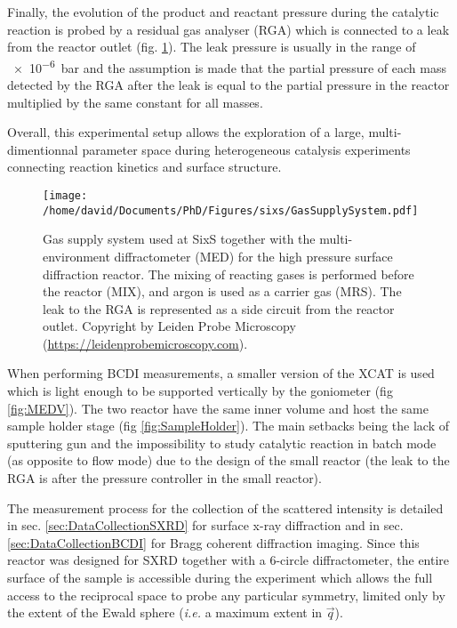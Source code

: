 Finally, the evolution of the product and reactant pressure during the catalytic reaction is probed by a residual gas analyser (RGA) which is connected to a leak from the reactor outlet (fig. \ref{fig:GasSupplySystem}).
The leak pressure is usually in the range of \qty{e-6}{\bar} and the assumption is made that the partial pressure of each mass detected by the RGA after the leak is equal to the partial pressure in the reactor multiplied by the same constant for all masses.

Overall, this experimental setup allows the exploration of a large, multi-dimentionnal parameter space during heterogeneous catalysis experiments connecting reaction kinetics and surface structure.

\begin{figure}[!htb]
    \centering
    \texttt{[image: /home/david/Documents/PhD/Figures/sixs/GasSupplySystem.pdf]}
    \caption{
    	Gas supply system used at SixS together with the multi-environment diffractometer (MED) for the high pressure surface diffraction reactor.
    	The mixing of reacting gases is performed before the reactor (MIX), and argon is used as a carrier gas (MRS).
    	The leak to the RGA is represented as a side circuit from the reactor outlet.
    	Copyright by Leiden Probe Microscopy (\url{https://leidenprobemicroscopy.com}).
    }
    \label{fig:GasSupplySystem}
\end{figure}

When performing BCDI measurements, a smaller version of the XCAT is used which is light enough to be supported vertically by the goniometer (fig \ref{fig:MEDV}).
The two reactor have the same inner volume and host the same sample holder stage (fig \ref{fig:SampleHolder}).
The main setbacks being the lack of sputtering gun and the impossibility to study catalytic reaction in batch mode (as opposite to flow mode) due to the design of the small reactor (the leak to the RGA is after the pressure controller in the small reactor).

The measurement process for the collection of the scattered intensity is detailed in sec. \ref{sec:DataCollectionSXRD} for surface x-ray diffraction and in sec. \ref{sec:DataCollectionBCDI} for Bragg coherent diffraction imaging.
Since this reactor was designed for SXRD together with a 6-circle diffractometer, the entire surface of the sample is accessible during the experiment which allows the full access to the reciprocal space to probe any particular symmetry, limited only by the extent of the Ewald sphere (\textit{i.e.} a maximum extent in $\vec{q}$).

